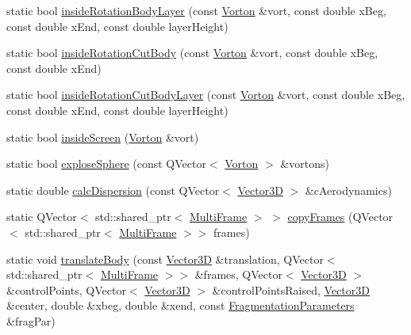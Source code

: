 \begin{DoxyCompactItemize}
\item 
static bool \mbox{\hyperlink{class_frame_calculations_a4de864fbf60a109e3d4b7b0954b08258}{inside\+Rotation\+Body\+Layer}} (const \mbox{\hyperlink{class_vorton}{Vorton}} \&vort, const double x\+Beg, const double x\+End, const double layer\+Height)
\item 
static bool \mbox{\hyperlink{class_frame_calculations_a32559ea09afd92c7b207b9d7db6e809d}{inside\+Rotation\+Cut\+Body}} (const \mbox{\hyperlink{class_vorton}{Vorton}} \&vort, const double x\+Beg, const double x\+End)
\item 
static bool \mbox{\hyperlink{class_frame_calculations_a39873d69a67397e20b19ac0de71e00c5}{inside\+Rotation\+Cut\+Body\+Layer}} (const \mbox{\hyperlink{class_vorton}{Vorton}} \&vort, const double x\+Beg, const double x\+End, const double layer\+Height)
\item 
static bool \mbox{\hyperlink{class_frame_calculations_acf3ff54e7c4b940de0b53c5c82a85a03}{inside\+Screen}} (\mbox{\hyperlink{class_vorton}{Vorton}} \&vort)
\item 
static bool \mbox{\hyperlink{class_frame_calculations_a6d5278ddbe021167c1ba71e68620e3df}{explose\+Sphere}} (const Q\+Vector$<$ \mbox{\hyperlink{class_vorton}{Vorton}} $>$ \&vortons)
\item 
static double \mbox{\hyperlink{class_frame_calculations_a0d4e2c1b30822b5e25fe39593febb978}{calc\+Dispersion}} (const Q\+Vector$<$ \mbox{\hyperlink{class_vector3_d}{Vector3D}} $>$ \&c\+Aerodynamics)
\item 
static Q\+Vector$<$ std\+::shared\+\_\+ptr$<$ \mbox{\hyperlink{class_multi_frame}{Multi\+Frame}} $>$ $>$ \mbox{\hyperlink{class_frame_calculations_ada975cd3e9d7edf466f9d31867044506}{copy\+Frames}} (Q\+Vector$<$ std\+::shared\+\_\+ptr$<$ \mbox{\hyperlink{class_multi_frame}{Multi\+Frame}} $>$$>$ frames)
\item 
static void \mbox{\hyperlink{class_frame_calculations_a854853c14187eec031c860438a886514}{translate\+Body}} (const \mbox{\hyperlink{class_vector3_d}{Vector3D}} \&translation, Q\+Vector$<$ std\+::shared\+\_\+ptr$<$ \mbox{\hyperlink{class_multi_frame}{Multi\+Frame}} $>$$>$ \&frames, Q\+Vector$<$ \mbox{\hyperlink{class_vector3_d}{Vector3D}} $>$ \&control\+Points, Q\+Vector$<$ \mbox{\hyperlink{class_vector3_d}{Vector3D}} $>$ \&control\+Points\+Raised, \mbox{\hyperlink{class_vector3_d}{Vector3D}} \&center, double \&xbeg, double \&xend, const \mbox{\hyperlink{struct_fragmentation_parameters}{Fragmentation\+Parameters}} \&frag\+Par)
\item 

\end{DoxyCompactItemize}
